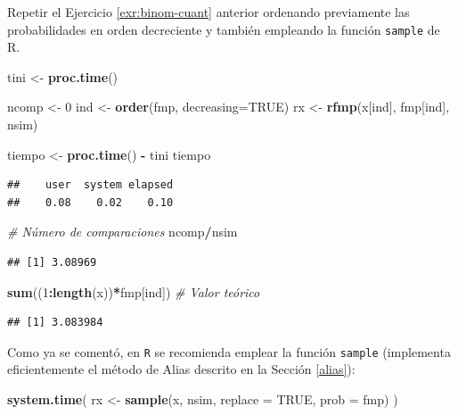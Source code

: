 \documentclass[
]{book}
\newenvironment{Shaded}{\begin{snugshade}}{\end{snugshade}}
\newcommand{\CommentTok}[1]{\textcolor[rgb]{0.56,0.35,0.01}{\textit{#1}}}
\newcommand{\DataTypeTok}[1]{\textcolor[rgb]{0.13,0.29,0.53}{#1}}
\newcommand{\DecValTok}[1]{\textcolor[rgb]{0.00,0.00,0.81}{#1}}
\newcommand{\KeywordTok}[1]{\textcolor[rgb]{0.13,0.29,0.53}{\textbf{#1}}}
\newcommand{\NormalTok}[1]{#1}
\newcommand{\OperatorTok}[1]{\textcolor[rgb]{0.81,0.36,0.00}{\textbf{#1}}}
\newcommand{\OtherTok}[1]{\textcolor[rgb]{0.56,0.35,0.01}{#1}}
\newcommand{\StringTok}[1]{\textcolor[rgb]{0.31,0.60,0.02}{#1}}
\theoremstyle{break}
\theoremstyle{definition}
\theoremstyle{definition}
\theoremstyle{definition}
\theoremstyle{remark}
\begin{document}
Repetir el Ejercicio \ref{exr:binom-cuant} anterior ordenando previamente las
probabilidades en orden decreciente y también empleando la
función \texttt{sample} de R.

\begin{Shaded}
\begin{Highlighting}[]
\NormalTok{tini <-}\StringTok{ }\KeywordTok{proc.time}\NormalTok{()}

\NormalTok{ncomp <-}\StringTok{ }\DecValTok{0}
\NormalTok{ind <-}\StringTok{ }\KeywordTok{order}\NormalTok{(fmp, }\DataTypeTok{decreasing=}\OtherTok{TRUE}\NormalTok{)}
\NormalTok{rx <-}\StringTok{ }\KeywordTok{rfmp}\NormalTok{(x[ind], fmp[ind], nsim)}

\NormalTok{tiempo <-}\StringTok{ }\KeywordTok{proc.time}\NormalTok{() }\OperatorTok{-}\StringTok{ }\NormalTok{tini}
\NormalTok{tiempo}
\end{Highlighting}
\end{Shaded}

\begin{verbatim}
##    user  system elapsed 
##    0.08    0.02    0.10
\end{verbatim}

\begin{Shaded}
\begin{Highlighting}[]
\CommentTok{# Número de comparaciones}
\NormalTok{ncomp}\OperatorTok{/}\NormalTok{nsim}
\end{Highlighting}
\end{Shaded}

\begin{verbatim}
## [1] 3.08969
\end{verbatim}

\begin{Shaded}
\begin{Highlighting}[]
\KeywordTok{sum}\NormalTok{((}\DecValTok{1}\OperatorTok{:}\KeywordTok{length}\NormalTok{(x))}\OperatorTok{*}\NormalTok{fmp[ind]) }\CommentTok{# Valor teórico}
\end{Highlighting}
\end{Shaded}

\begin{verbatim}
## [1] 3.083984
\end{verbatim}

Como ya se comentó, en \texttt{R} se recomienda emplear la función \texttt{sample}
(implementa eficientemente el método de Alias descrito en la Sección \ref{alias}):

\begin{Shaded}
\begin{Highlighting}[]
\KeywordTok{system.time}\NormalTok{( rx <-}\StringTok{ }\KeywordTok{sample}\NormalTok{(x, nsim, }\DataTypeTok{replace =} \OtherTok{TRUE}\NormalTok{, }\DataTypeTok{prob =}\NormalTok{ fmp) )}
\end{Highlighting}
\end{Shaded}
\end{document}
